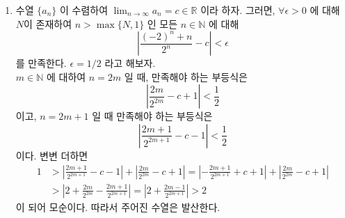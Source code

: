 \documentclass[12pt]{report}
\newcommand{\numl}[1]{\item[\large\textbf{\sffamily #1.}]}
\newcommand{\bb}[1]{\mathbb{#1}}
\newcommand{\ra}{\rightarrow}
\newcommand{\abs}[1]{\left|#1\right|}
\newcommand{\ds}{\displaystyle}
\begin{document}
\begin{enumerate}
\numl{6} 수열 $\{a_n\}$ 이 수렴하여 $\ds \lim_{n \ra \infty} a_n = c \in \bb{R}$ 이라 하자. 그러면, $\forall \epsilon > 0$ 에 대해 $N$이 존재하여 $n > \max\{N, 1\}$ 인 모든 $n\in \bb{N}$ 에 대해 $$\abs{\frac{(-2)^n+n}{2^n} - c} < \epsilon$$ 를 만족한다. $\epsilon = 1/2$ 라고 해보자.\\$m\in \bb{N}$ 에 대하여 $n = 2m$ 일 때, 만족해야 하는 부등식은 $$\abs{\frac{2m}{2^{2m}}-c+1}<\frac{1}{2}$$ 이고, $n = 2m+1$ 일 때 만족해야 하는 부등식은 $$\abs{\frac{2m+1}{2^{2m+1}} - c - 1} < \frac{1}{2}$$ 이다. 변변 더하면
$$\begin{aligned}
	1 &> \abs{\frac{2m+1}{2^{2m+1}} - c - 1} + \abs{\frac{2m}{2^{2m}}-c+1} = \abs{-\frac{2m+1}{2^{2m+1}} + c + 1} +  \abs{\frac{2m}{2^{2m}}-c+1} \\ &> \abs{2 + \frac{2m}{2^{2m}} - \frac{2m+1}{2^{2m+1}}} = \abs{2 + \frac{2m-1}{2^{2m+1}}} > 2
\end{aligned}$$
이 되어 모순이다. 따라서 주어진 수열은 발산한다.


\end{enumerate}
\end{document}
